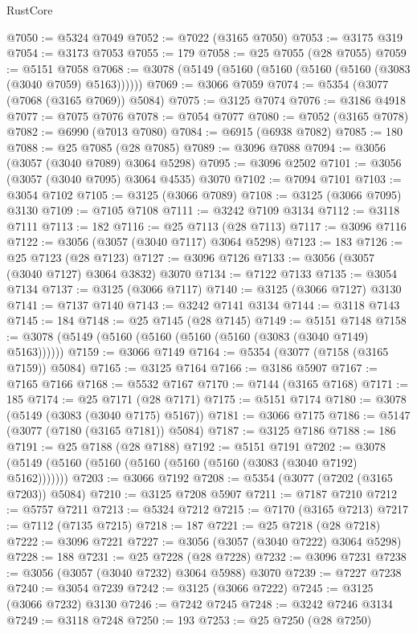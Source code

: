 \begin{lexlean}{RustCore}
\begin{coremodule}
@7050 := @5324 @7049
@7052 := @7022 (@3165 @7050)
@7053 := @3175 @319
@7054 := @3173 @7053
@7055 := 179
@7058 := @25 @7055 (@28 @7055)
@7059 := @5151 @7058
@7068 := @3078 (@5149 (@5160 (@5160 (@5160 (@5160 (@3083 (@3040 @7059) @5163))))))
@7069 := @3066 @7059
@7074 := @5354 (@3077 (@7068 (@3165 @7069)) @5084)
@7075 := @3125 @7074
@7076 := @3186 @4918
@7077 := @7075 @7076
@7078 := @7054 @7077
@7080 := @7052 (@3165 @7078)
@7082 := @6990 (@7013 @7080)
@7084 := @6915 (@6938 @7082)
@7085 := 180
@7088 := @25 @7085 (@28 @7085)
@7089 := @3096 @7088
@7094 := @3056 (@3057 (@3040 @7089) @3064 @5298)
@7095 := @3096 @2502
@7101 := @3056 (@3057 (@3040 @7095) @3064 @4535) @3070
@7102 := @7094 @7101
@7103 := @3054 @7102
@7105 := @3125 (@3066 @7089)
@7108 := @3125 (@3066 @7095) @3130
@7109 := @7105 @7108
@7111 := @3242 @7109 @3134
@7112 := @3118 @7111
@7113 := 182
@7116 := @25 @7113 (@28 @7113)
@7117 := @3096 @7116
@7122 := @3056 (@3057 (@3040 @7117) @3064 @5298)
@7123 := 183
@7126 := @25 @7123 (@28 @7123)
@7127 := @3096 @7126
@7133 := @3056 (@3057 (@3040 @7127) @3064 @3832) @3070
@7134 := @7122 @7133
@7135 := @3054 @7134
@7137 := @3125 (@3066 @7117)
@7140 := @3125 (@3066 @7127) @3130
@7141 := @7137 @7140
@7143 := @3242 @7141 @3134
@7144 := @3118 @7143
@7145 := 184
@7148 := @25 @7145 (@28 @7145)
@7149 := @5151 @7148
@7158 := @3078 (@5149 (@5160 (@5160 (@5160 (@5160 (@3083 (@3040 @7149) @5163))))))
@7159 := @3066 @7149
@7164 := @5354 (@3077 (@7158 (@3165 @7159)) @5084)
@7165 := @3125 @7164
@7166 := @3186 @5907
@7167 := @7165 @7166
@7168 := @5532 @7167
@7170 := @7144 (@3165 @7168)
@7171 := 185
@7174 := @25 @7171 (@28 @7171)
@7175 := @5151 @7174
@7180 := @3078 (@5149 (@3083 (@3040 @7175) @5167))
@7181 := @3066 @7175
@7186 := @5147 (@3077 (@7180 (@3165 @7181)) @5084)
@7187 := @3125 @7186
@7188 := 186
@7191 := @25 @7188 (@28 @7188)
@7192 := @5151 @7191
@7202 := @3078 (@5149 (@5160 (@5160 (@5160 (@5160 (@5160 (@3083 (@3040 @7192) @5162)))))))
@7203 := @3066 @7192
@7208 := @5354 (@3077 (@7202 (@3165 @7203)) @5084)
@7210 := @3125 @7208 @5907
@7211 := @7187 @7210
@7212 := @5757 @7211
@7213 := @5324 @7212
@7215 := @7170 (@3165 @7213)
@7217 := @7112 (@7135 @7215)
@7218 := 187
@7221 := @25 @7218 (@28 @7218)
@7222 := @3096 @7221
@7227 := @3056 (@3057 (@3040 @7222) @3064 @5298)
@7228 := 188
@7231 := @25 @7228 (@28 @7228)
@7232 := @3096 @7231
@7238 := @3056 (@3057 (@3040 @7232) @3064 @5988) @3070
@7239 := @7227 @7238
@7240 := @3054 @7239
@7242 := @3125 (@3066 @7222)
@7245 := @3125 (@3066 @7232) @3130
@7246 := @7242 @7245
@7248 := @3242 @7246 @3134
@7249 := @3118 @7248
@7250 := 193
@7253 := @25 @7250 (@28 @7250)

\end{coremodule}
\end{lexlean}
